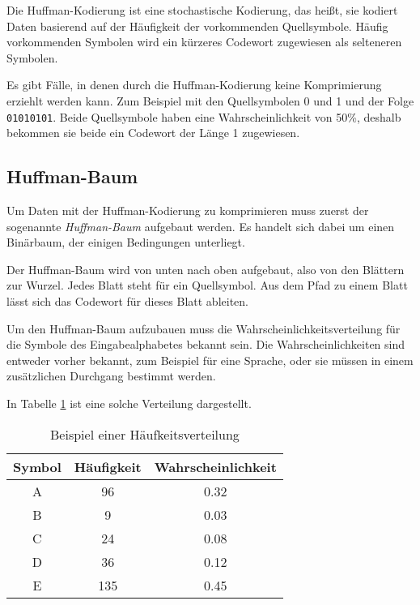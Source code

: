 \documentclass[twoside,11pt,a4paper]{article}
\theoremstyle{break}
\begin{document}
Die Huffman-Kodierung ist eine stochastische Kodierung, das heißt, sie
kodiert Daten basierend auf der Häufigkeit der vorkommenden
Quellsymbole. Häufig vorkommenden Symbolen wird ein kürzeres Codewort
zugewiesen als selteneren Symbolen.

Es gibt Fälle, in denen durch die Huffman-Kodierung keine
Komprimierung erziehlt werden kann. Zum Beispiel mit den Quellsymbolen
0 und 1 und der Folge {\tt01010101}. Beide Quellsymbole haben eine
Wahrscheinlichkeit von 50\%, deshalb bekommen sie beide ein Codewort
der Länge 1 zugewiesen.

\subsection{Huffman-Baum}

Um Daten mit der Huffman-Kodierung zu komprimieren muss zuerst der
sogenannte \emph{Huffman-Baum} aufgebaut werden. Es handelt sich dabei
um einen Binärbaum, der einigen Bedingungen unterliegt.

Der Huffman-Baum wird von unten nach oben aufgebaut, also von den
Blättern zur Wurzel. Jedes Blatt steht für ein Quellsymbol. Aus dem
Pfad zu einem Blatt lässt sich das Codewort für dieses Blatt ableiten.

Um den Huffman-Baum aufzubauen muss die Wahrscheinlichkeitsverteilung
für die Symbole des Eingabealphabetes bekannt sein. Die
Wahrscheinlichkeiten sind entweder vorher bekannt, zum Beispiel für
eine Sprache, oder sie müssen in einem zusätzlichen Durchgang bestimmt
werden.

In Tabelle \ref{tab:HBEX} ist eine solche Verteilung dargestellt.


\begin{table}[h]
\centering
\caption{Beispiel einer Häufkeitsverteilung}

\begin{tabular}{c|c|c}
Symbol & Häufigkeit & Wahrscheinlichkeit \\ \hline
A & 96  & 0.32 \\
B & 9   & 0.03 \\
C & 24  & 0.08 \\
D & 36  & 0.12 \\
E & 135 & 0.45 \\
\end{tabular}
\label{tab:HBEX}
\end{table}
\end{document}
